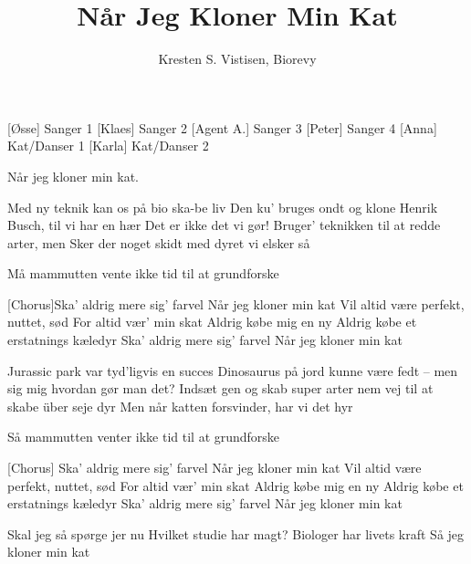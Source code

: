 \documentclass[a4paper,12pt]{article}
\title{Når Jeg Kloner Min Kat}
\author{Kresten S. Vistisen, Biorevy}
\begin{document}
\maketitle

\begin{roles}
	[Øsse] Sanger 1
	[Klaes] Sanger 2
	[Agent A.] Sanger 3
	[Peter] Sanger 4
	[Anna] Kat/Danser 1
	[Karla] Kat/Danser 2
\end{roles}


\begin{props}
\end{props}

\begin{song}


Når jeg kloner min kat.

Med ny teknik kan os på bio ska-be liv
Den ku' bruges ondt og klone Henrik Busch, til vi har en hær
Det er ikke det vi gør!
Bruger' teknikken til at redde arter, men
Sker der noget skidt med dyret vi elsker så

Må mammutten vente
ikke tid til at grundforske

[Chorus]Ska' aldrig mere sig' farvel
Når jeg kloner min kat
Vil altid være perfekt, nuttet, sød
For altid vær' min skat
Aldrig købe mig en ny
Aldrig købe et erstatnings kæledyr
Ska' aldrig mere sig' farvel
Når jeg kloner min kat


Jurassic park var tyd'ligvis en succes
Dinosaurus på jord kunne være fedt -- men sig mig hvordan gør man det?
Indsæt gen og skab super arter nem vej til at skabe über seje dyr
Men når katten forsvinder, har vi det hyr

Så mammutten venter
ikke tid til at grundforske

[Chorus]
Ska' aldrig mere sig' farvel
Når jeg kloner min kat
Vil altid være perfekt, nuttet, sød
For altid vær' min skat
Aldrig købe mig en ny
Aldrig købe et erstatnings kæledyr
Ska' aldrig mere sig' farvel
Når jeg kloner min kat

Skal jeg så spørge jer nu
Hvilket studie har magt?
Biologer har livets kraft
Så jeg kloner min kat


\end{song}
\end{document}
